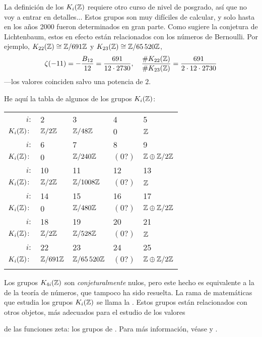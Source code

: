 \documentclass{article}
\numberwithin{equation}{section}
\theoremstyle{definition}
\begin{document}
La definición de los $K_i (\mathbb{Z})$ requiere otro curso de nivel de posgrado, así
que no voy a entrar en detalles... Estos grupos son muy difíciles de calcular,
y solo hasta en los años 2000 fueron determinados en gran parte. Como sugiere
la conjetura de Lichtenbaum, estos en efecto están relacionados con los números
de Bernoulli. Por ejemplo, $K_{22} (\mathbb{Z}) \cong \mathbb{Z}/691 \mathbb{Z}$ y
$K_{23} (\mathbb{Z}) \cong \mathbb{Z} / 65\,520 \mathbb{Z}$,
\[ \zeta (-11) = -\frac{B_{12}}{12} = \frac{691}{12\cdot 2730}, \quad
  \frac{\# K_{22} (\mathbb{Z})}{\# K_{23} (\mathbb{Z})} = \frac{691}{2\cdot 12\cdot 2730} \]
---los valores coinciden salvo una potencia de $2$.

\pagebreak

He aquí la tabla de algunos de los grupos $K_i (\mathbb{Z})$:

\begin{center}
  \begin{tabular}{rx{1.8cm}x{1.8cm}x{1.8cm}x{1.8cm}}
    \hline
      $i\colon$ & 2 & 3 & 4 & 5 \tabularnewline
      \rule{0pt}{1.1em}$K_i (\mathbb{Z})\colon$ & $\mathbb{Z}/2\mathbb{Z}$ & $\mathbb{Z}/48\mathbb{Z}$ & $0$ & $\mathbb{Z}$ \tabularnewline
      \hline
      $i\colon$ & 6 & 7 & 8 & 9 \tabularnewline
      \rule{0pt}{1.1em}$K_i (\mathbb{Z})\colon$ & $0$ & $\mathbb{Z}/240\mathbb{Z}$ & $(0?)$ & $\mathbb{Z}\oplus\mathbb{Z}/2\mathbb{Z}$ \tabularnewline
      \hline
      $i\colon$ & 10 & 11 & 12 & 13 \tabularnewline
      \rule{0pt}{1.1em}$K_i (\mathbb{Z})\colon$ & $\mathbb{Z}/2\mathbb{Z}$ & $\mathbb{Z}/1008\mathbb{Z}$ & $(0?)$ & $\mathbb{Z}$ \tabularnewline
      \hline
      $i\colon$ & 14 & 15 & 16 & 17 \tabularnewline
      \rule{0pt}{1.1em}$K_i (\mathbb{Z})\colon$ & $0$ & $\mathbb{Z}/480\mathbb{Z}$ & $(0?)$ & $\mathbb{Z}\oplus\mathbb{Z}/2\mathbb{Z}$ \tabularnewline
      \hline
      $i\colon$ & 18 & 19 & 20 & 21 \tabularnewline
      \rule{0pt}{1.1em}$K_i (\mathbb{Z})\colon$ & $\mathbb{Z}/2\mathbb{Z}$ & $\mathbb{Z}/528\mathbb{Z}$ & $(0?)$ & $\mathbb{Z}$ \tabularnewline
      \hline
      $i\colon$ & 22 & 23 & 24 & 25 \tabularnewline
      \rule{0pt}{1.1em}$K_i (\mathbb{Z})\colon$ & $\mathbb{Z}/691\mathbb{Z}$ & $\mathbb{Z}/65\,520\mathbb{Z}$ & $(0?)$ & $\mathbb{Z}\oplus\mathbb{Z}/2\mathbb{Z}$ \tabularnewline
      \hline\tabularnewline
  \end{tabular}
\end{center}

Los grupos $K_{4i} (\mathbb{Z})$ son \emph{conjeturalmente} nulos, pero este hecho
es equivalente a la  de la teoría de números,
que tampoco ha sido resuelta. La rama de matemáticas que estudia los grupos
$K_i (\mathbb{Z})$ se llama la . Estos grupos están
relacionados con otros objetos, más adecuados para el estudio de los valores

de las funciones zeta: los grupos de . Para más
información, véase \cite{Kahn-2005} y \cite{Weibel-2005}.
\end{document}
